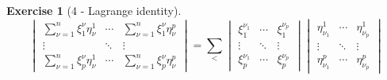 \documentclass[letterpaper,12pt]{article}
\theoremstyle{definition}
\newtheorem*{exer}{Exercise}
\theoremstyle{remark}
\begin{document}
\begin{exer}[4 - Lagrange identity]
\[
\renewcommand{\arraystretch}{1.5}
\begin{vmatrix}
\sum_{\nu=1}^n\xi_1^{\nu}\eta^1_{\nu}&\cdots&\sum_{\nu=1}^n\xi_1^{\nu}\eta^p_{\nu}\\
\vdots&\ddots&\vdots\\
\sum_{\nu=1}^n\xi_p^{\nu}\eta^1_{\nu}&\cdots&\sum_{\nu=1}^n\xi_p^{\nu}\eta^p_{\nu}
\end{vmatrix}
=
\sum_{<}
\begin{vmatrix}
\xi_1^{\nu_1}&\cdots&\xi_1^{\nu_p}\\
\vdots&\ddots&\vdots\\
\xi_p^{\nu_1}&\cdots&\xi_p^{\nu_p}
\end{vmatrix}
\begin{vmatrix}
\eta^1_{\nu_1}&\cdots&\eta^1_{\nu_p}\\
\vdots&\ddots&\vdots\\
\eta^p_{\nu_1}&\cdots&\eta^p_{\nu_p}
\end{vmatrix}
\tag{1}\]
\end{exer}
\end{document}
